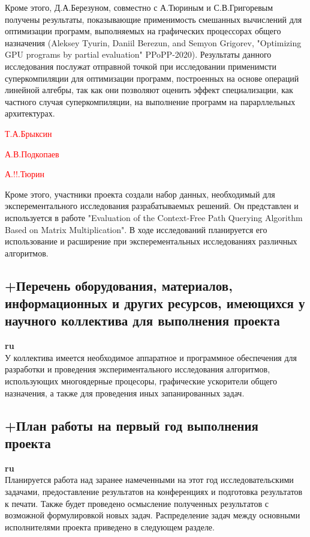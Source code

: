 \documentclass[12pt]{article}  %
\theoremstyle{remark}
\newcommand{\checkme}[1]{\textcolor{red}{#1}}
\begin{document}
Кроме этого, Д.А.Березуном, совместно с А.Тюриным и С.В.Григоревым получены результаты, показывающие применимость смешанных вычислений для оптимизации программ, выполняемых на графических процессорах общего назначения (Aleksey Tyurin, Daniil Berezun, and Semyon Grigorev, "Optimizing GPU programs by partial evaluation" PPoPP-2020). Результаты данного исследования послужат отправной точкой при исследовании применимсти суперкомпиляции для оптимизации программ, построенных на основе операций линейной алгебры, так как они позволяют оценить эффект специализации, как частного случая суперкомпиляции, на выполнение программ на парарллельных архитектурах.

\checkme{Т.А.Брыксин}

\checkme{А.В.Подкопаев}

\checkme{А.!!.Тюрин}

Кроме этого, участники проекта создали набор данных, необходимый для эксперементального исследования разрабатываемых решений. Он представлен и используется в работе "Evaluation of the Context-Free Path Querying Algorithm Based on Matrix Multiplication". В ходе исследований планируется его использование и расширение при эксперементальных исследованиях различных алгоритмов.


\subsection{+Перечень оборудования, материалов, информационных и других ресурсов, имеющихся у научного коллектива для выполнения проекта}
\textbf{ru}\\
%
У коллектива имеется необходимое аппаратное и программное обеспечения для разработки и проведения экспериментального исследования алгоритмов, использующих многоядерные процесоры, графические ускорители общего назначения, а также для проведения иных запанированных задач.

\subsection{+План работы на первый год выполнения проекта}

\textbf{ru}\\

Планируется работа над заранее намеченными на этот год исследовательскими задачами, предоставление результатов на конференциях и подготовка результатов к печати. Также будет проведено осмысление полученных результатов с возможной формулировкой новых задач. Распределение задач между основными исполнителями проекта приведено в следующем разделе.
\end{document}
